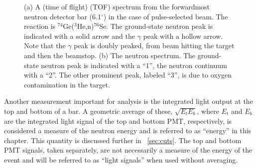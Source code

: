 \begin{figure}[!htbp]
\centering
{}
\caption[Timing spectrum due to $^{74}$Ge($^3$He,n)$^{76}$Se.]{(a) A (time of flight) (TOF) spectrum from the forwardmost neutron detector bar (6.1$^{\circ}$) in the case of pulse-selected beam.  The reaction is $^{74}$Ge($^3$He,n)$^{76}$Se.  The ground-state neutron peak is indicated with a solid arrow and the $\gamma$ peak with a hollow arrow.  Note that the $\gamma$ peak is doubly peaked, from beam hitting the target and then the beamstop.  (b) The neutron spectrum.  The ground-state neutron peak is indicated with a ``1'', the neutron continuum with a ``2''.  The other prominent peak, labeled ``3'', is due to oxygen contamination in the target.}
\label{fig:time}
\end{figure}
Another measurement important for analysis is the integrated light output at the top and bottom of a bar.  A geometric average of these, $\sqrt{E_tE_b}$, where $E_t$ and $E_b$ are the integrated light signal of the top and bottom PMT, respectively, is considered a measure of the neutron energy and is referred to as ``energy'' in this chapter.  This quantity is discussed further in {\sect}~\ref{sec:cuts}.   The top and bottom PMT signals, taken separately, are not necessarily a measure of the energy of the event and will be referred to as ``light signals'' when used without averaging. 

